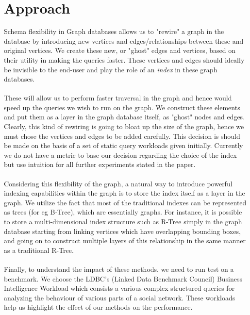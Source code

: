 \section{Approach}
Schema flexibility in Graph databases allows us to "rewire" a graph in the database by introducing new vertices and edges/relationships between these and original vertices. We create these new, or "ghost" edges and vertices, based on their utility in making the queries faster. These vertices and edges should ideally be invisible to the end-user and play the role of an \textit{index} in these graph databases. \\
\\
These will allow us to perform faster traversal in the graph and hence would speed up the queries we wish to run on the graph. We construct these elements and put them as a layer in the graph database itself, as "ghost" nodes and edges. Clearly, this kind of rewiring is going to bloat up the size of the graph, hence we must chose the vertices and edges to be added carefully. This decision is should be made on the basis of a set of static query workloads given initially. Currently we do not have a metric to base our decision regarding the choice of the index but use intuition for all further experiments stated in the paper.\\
\\
Considering this flexibility of the graph, a natural way to introduce powerful indexing capabilities within the graph is to store the index itself as a layer in the graph. We utilize the fact that most of the traditional indexes can be represented as trees (for eg B-Tree), which are essentially graphs. For instance, it is possible to store a multi-dimensional index structure such as R-Tree simply in the graph database starting from linking vertices which have overlapping bounding boxes, and going on to construct multiple layers of this relationship in the same manner as a traditional R-Tree. \\
\\
Finally, to understand the impact of these methods, we need to run test on a benchmark. We choose the LDBC's  \cite{benchmark} (Linked Data Benchmark Council) Business Intelligence Workload which consists a various complex structured queries for analyzing the behaviour of various parts of a social network. These workloads help us highlight the effect of our methods on the performance. 


